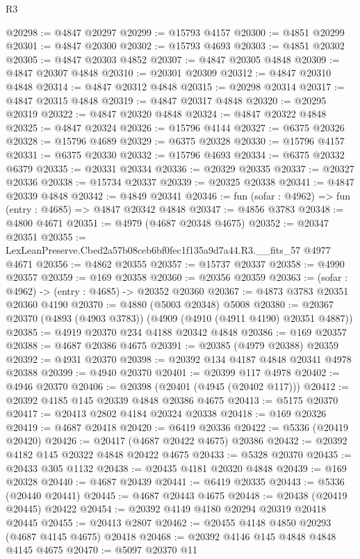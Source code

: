 \begin{lexlean}{R3}
\begin{coremodule}
@20298 := @4847 @20297
@20299 := @15793 @4157
@20300 := @4851 @20299
@20301 := @4847 @20300
@20302 := @15793 @4693
@20303 := @4851 @20302
@20305 := @4847 @20303 @4852
@20307 := @4847 @20305 @4848
@20309 := @4847 @20307 @4848
@20310 := @20301 @20309
@20312 := @4847 @20310 @4848
@20314 := @4847 @20312 @4848
@20315 := @20298 @20314
@20317 := @4847 @20315 @4848
@20319 := @4847 @20317 @4848
@20320 := @20295 @20319
@20322 := @4847 @20320 @4848
@20324 := @4847 @20322 @4848
@20325 := @4847 @20324
@20326 := @15796 @4144
@20327 := @6375 @20326
@20328 := @15796 @4689
@20329 := @6375 @20328
@20330 := @15796 @4157
@20331 := @6375 @20330
@20332 := @15796 @4693
@20334 := @6375 @20332 @6379
@20335 := @20331 @20334
@20336 := @20329 @20335
@20337 := @20327 @20336
@20338 := @15734 @20337
@20339 := @20325 @20338
@20341 := @4847 @20339 @4848
@20342 := @4849 @20341
@20346 := fun (sofar : @4962) => fun (entry : @4685) => @4847 @20342 @4848
@20347 := @4856 @3783
@20348 := @4800 @4671
@20351 := @4979 (@4687 @20348 @4675)
@20352 := @20347 @20351
@20355 := LexLeanPreserve.Cbed2a57b08ceb6bf0fec1f135a9d7a44.R3.__fits_57 @4977 @4671
@20356 := @4862 @20355
@20357 := @15737 @20337
@20358 := @4990 @20357
@20359 := @169 @20358
@20360 := @20356 @20359
@20363 := (sofar : @4962) -> (entry : @4685) -> @20352 @20360
@20367 := @4873 @3783 @20351 @20360 @4190
@20370 := @4880 (@5003 @20348) @5008
@20380 := @20367 @20370 (@4893 (@4903 @3783)) (@4909 (@4910 (@4911 @4190) @20351 @4887))
@20385 := @4919 @20370 @234 @4188 @20342 @4848
@20386 := @169 @20357
@20388 := @4687 @20386 @4675
@20391 := @20385 (@4979 @20388) @20359
@20392 := @4931 @20370
@20398 := @20392 @134 @4187 @4848 @20341 @4978 @20388
@20399 := @4940 @20370
@20401 := @20399 @117 @4978
@20402 := @4946 @20370
@20406 := @20398 (@20401 (@4945 (@20402 @117)))
@20412 := @20392 @4185 @145 @20339 @4848 @20386 @4675
@20413 := @5175 @20370
@20417 := @20413 @2802 @4184 @20324 @20338
@20418 := @169 @20326
@20419 := @4687 @20418
@20420 := @6419 @20336
@20422 := @5336 (@20419 @20420)
@20426 := @20417 (@4687 @20422 @4675) @20386
@20432 := @20392 @4182 @145 @20322 @4848 @20422 @4675
@20433 := @5328 @20370
@20435 := @20433 @305 @1132
@20438 := @20435 @4181 @20320 @4848
@20439 := @169 @20328
@20440 := @4687 @20439
@20441 := @6419 @20335
@20443 := @5336 (@20440 @20441)
@20445 := @4687 @20443 @4675
@20448 := @20438 (@20419 @20445) @20422
@20454 := @20392 @4149 @4180 @20294 @20319 @20418 @20445
@20455 := @20413 @2807
@20462 := @20455 @4148 @4850 @20293 (@4687 @4145 @4675) @20418
@20468 := @20392 @4146 @145 @4848 @4848 @4145 @4675
@20470 := @5097 @20370 @11

\end{coremodule}
\end{lexlean}

